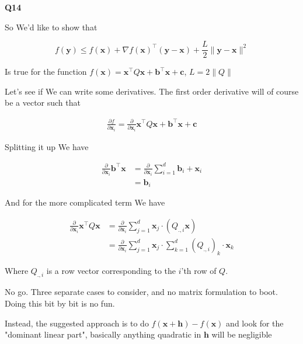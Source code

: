 \documentclass{article}
\begin{document}
		
	\textbf{Q14}
	
		So We'd like to show that 
		
		\[ f(\mathbf{y}) \le f(\mathbf{x}) + \nabla f(\mathbf{x})^\top(\mathbf{y-x}) + \frac{L}{2}\|\mathbf{y-x}\|^2 \]
		
		Is true for the function $f(\mathbf{x}) = \mathbf{x}^\top Q\mathbf{x} + \mathbf{b}^\top\mathbf{x} + \mathbf{c}$,  $L = 2\|Q\|$ 
		
		Let's see if We can write some derivatives. The first order derivative will of course be a vector such that 
		
		\begin{align}
			\frac{\partial f}{\partial \mathbf{x}_i} = \frac{\partial }{\partial \mathbf{x}_i} \mathbf{x}^\top Q\mathbf{x} + \mathbf{b}^\top\mathbf{x} + \mathbf{c}
		\end{align}
		
		Splitting it up We have 
		
		\begin{align}
			\frac{\partial }{\partial \mathbf{x}_i}  \mathbf{b}^\top\mathbf{x} &= \frac{\partial }{\partial \mathbf{x}_i} \sum^d_{i=1} \mathbf{b}_i + \mathbf{x}_i\\
			&= \mathbf{b}_i
		\end{align}
		
		And for the more complicated term We have 
		
		\begin{align}
			\frac{\partial }{\partial \mathbf{x}_i} \mathbf{x}^\top Q\mathbf{x} &= \frac{\partial }{\partial \mathbf{x}_i} \sum^d_{j=1} \mathbf{x}_j \cdot (Q_{.,i} \mathbf{x})\\
			&= \frac{\partial }{\partial \mathbf{x}_i} \sum^d_{j=1} \mathbf{x}_j \cdot \sum^d_{k=1} (Q_{.,i})_k \cdot \mathbf{x}_k
		\end{align}
		
		Where $Q_{.,i}$ is a row vector corresponding to the $i$'th row of $Q$.
		
		No go. Three separate cases to consider, and no matrix formulation to boot. Doing this bit by bit is no fun.
		
		Instead, the suggested approach is to do $f(\mathbf{x+h}) - f(\mathbf{x})$ and look for the "dominant linear part", basically anything quadratic in $\mathbf{h}$ will be negligible 
		
\end{document}

